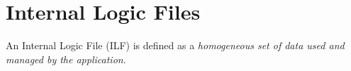 \section{Internal Logic Files}
An Internal Logic File (ILF) is defined as a \emph{homogeneous set of data used
and managed by the application}.
